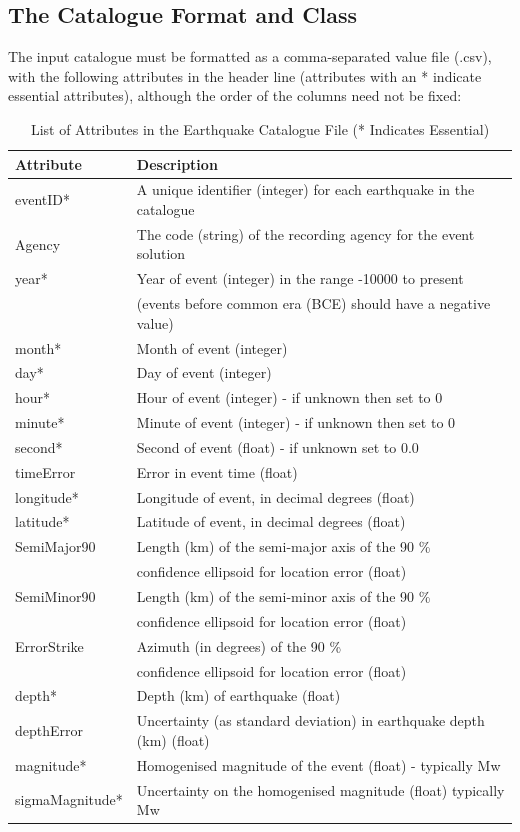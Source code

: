 \subsection{The Catalogue Format and Class}

The input catalogue must be formatted as a comma-separated value file (.csv), with the following attributes in the header line (attributes with an * indicate essential attributes), although the order of the columns need not be fixed:

\begin{table}
\begin{tabular}{|l|l|}  \hline 
Attribute & Description \\ \hline
eventID* & A unique identifier (integer) for each earthquake in the catalogue \\
Agency & The code (string) of the recording agency for the event solution  \\
year* & Year of event (integer) in the range -10000 to present \\
 & (events before common era (BCE) should have a negative value)\\
month* & Month of event (integer)\\
day* & Day of event (integer) \\
hour* & Hour of event (integer) - if unknown then set to 0 \\
minute* & Minute of event (integer) - if unknown then set to 0 \\
second* & Second of event (float) - if unknown set to 0.0 \\
timeError & Error in event time (float) \\
longitude* & Longitude of event, in decimal degrees (float) \\
latitude* & Latitude of event, in decimal degrees (float) \\
SemiMajor90 & Length (km) of the semi-major axis of the 90 \% \\
            & confidence ellipsoid for location error (float) \\
SemiMinor90 & Length (km) of the semi-minor axis of the 90 \% \\
            & confidence ellipsoid for location error (float) \\
ErrorStrike & Azimuth (in degrees) of the 90 \% \\
            & confidence ellipsoid for location error (float) \\
depth* & Depth (km) of earthquake (float)\\
depthError & Uncertainty (as standard deviation) in earthquake depth (km) (float)\\
magnitude* & Homogenised magnitude of the event (float) - typically Mw \\
sigmaMagnitude* & Uncertainty on the homogenised magnitude (float) typically Mw \\ \hline
\end{tabular}
\caption{List of Attributes in the Earthquake Catalogue File (* Indicates Essential)}
\label{tab: EQCatalogueFormat}
\end{table}

